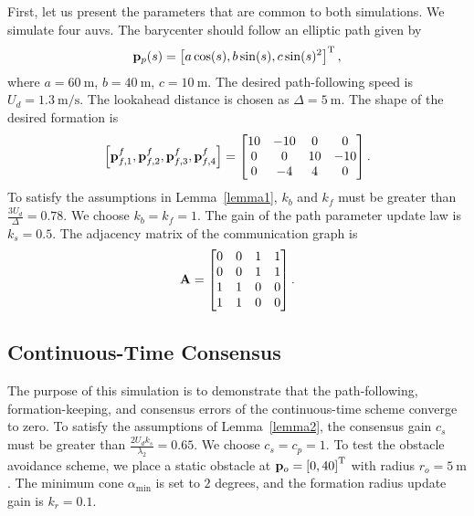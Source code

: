 First, let us present the parameters that are common to both simulations.
We simulate four \glspl{auv}.
The barycenter should follow an elliptic path given by
\begin{equation}
    \mathbf{p}_p(s) = \left[a \cos(s), b \sin(s), c \sin(s)^2\right]^{\mathrm{T}},
\end{equation}
where $a = \SI{60}{\meter}$, $b = \SI{40}{\meter}$, $c = \SI{10}{\meter}$.
The desired path-following speed is $U_d = \SI{1.3}{\meter\per\second}$.
The lookahead distance is chosen as $\Delta = \SI{5}{\meter}$.
The shape of the desired formation is
\begin{equation}
    \left[\mathbf{p}_{f, 1}^f, \mathbf{p}_{f, 2}^f, \mathbf{p}_{f, 3}^f, \mathbf{p}_{f, 4}^f\right]
    =
    \begin{bmatrix}
        10 & -10 & 0 & 0\\ 0 & 0 & 10 & -10\\ 0 & -4 & 4 & 0
    \end{bmatrix}.
\end{equation}
To satisfy the assumptions in Lemma~\ref{lemma1}, $k_b$ and $k_f$ must be greater than $\frac{3U_d}{\Delta} = 0.78$.
We choose $k_b = k_f = 1$.
The gain of the path parameter update law is $k_s = 0.5$.
The adjacency matrix of the communication graph is
\begin{equation}
    \mathbf{A}
    =
    \begin{bmatrix}
        0 & 0 & 1 & 1\\ 0 & 0 & 1 & 1\\ 1 & 1 & 0 & 0\\ 1 & 1 & 0 & 0
    \end{bmatrix}.
\end{equation}

\subsection{Continuous-Time Consensus}


The purpose of this simulation is to demonstrate that the path-following, formation-keeping, and consensus errors of the continuous-time scheme converge to zero.
To satisfy the assumptions of Lemma~\ref{lemma2}, the consensus gain $c_s$ must be greater than $\frac{2 U_d k_s}{\lambda_2} = 0.65$. We choose $c_s = c_p = 1$.
To test the obstacle avoidance scheme, we place a static obstacle at $\mathbf{p}_o = \left[0, 40\right]^{\mathrm{T}}$ with radius $r_o = \SI{5}{\meter}$.
The minimum cone $\alpha_{\min}$ is set to $2$ degrees, and the formation radius update gain is $k_r = 0.1$.

